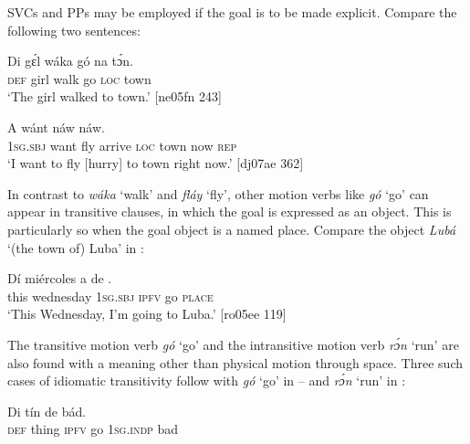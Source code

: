 \z

SVCs and PPs may be employed if the goal is to be made explicit. Compare the following two sentences:


\ea%
    \label{ex:key:1082}
    \gll Di  gɛ́l    wáka  gó  na  tɔ́n.\\
\textsc{def}  girl    walk  go  \textsc{loc}  town\\

\glt ‘The girl walked to town.’ [ne05fn 243]
\z


\ea%
    \label{ex:key:1083}
    \gll A    wánt             náw    náw.\\
\textsc{1sg.sbj}  want  fly  arrive  \textsc{loc}  town  now    \textsc{rep}\\

\glt ‘I want to fly [hurry] to town right now.’ [dj07ae 362]
\z

In contrast to \textit{wáka} ‘walk’ and \textit{fláy} ‘fly’, other motion verbs like \textit{gó} ‘go’ can appear in transitive clauses, in which the goal is expressed as an object. This is particularly so when the goal object is a named place. Compare the object \textit{Lubá} ‘(the town of) Luba’ in :


\ea%
    \label{ex:key:1084}
    \gll Dí  miércoles  a      de    .\\
this  wednesday  \textsc{1sg.sbj}    \textsc{ipfv}  go  \textsc{place}\\

\glt ‘This Wednesday, I’m going to Luba.’ [ro05ee 119]
\z

The transitive motion verb \textit{gó} ‘go’ and the intransitive motion verb \textit{rɔ́n} ‘run’ are also found with a meaning other than physical motion through space. Three such cases of idiomatic transitivity follow with \textit{gó} ‘go’ in – and \textit{rɔ́n} ‘run’ in :


\ea%
    \label{ex:key:1085}
    \gll Di  tín    de        bád.\\
\textsc{def}  thing  \textsc{ipfv}  go  \textsc{1sg.indp}  bad\\

